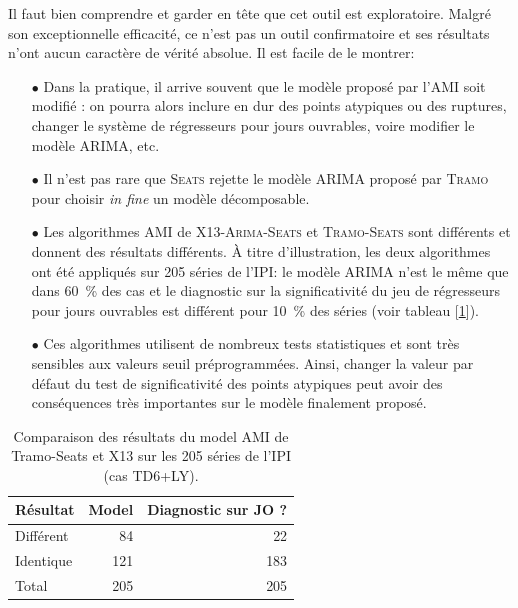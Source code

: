 \documentclass[12pt, a4paper, french]{article}
\begin{document}
Il faut bien comprendre et garder en tête que cet outil est exploratoire. Malgré son exceptionnelle efficacité, ce n'est pas un outil confirmatoire et ses résultats n'ont aucun caractère de vérité absolue. Il est facile de le montrer:
\begin{itemize}
	\item[$\bullet$] Dans la pratique, il arrive souvent que le modèle proposé par l'AMI soit modifié : on pourra alors inclure en dur des points atypiques ou des ruptures, changer le système de régresseurs pour jours ouvrables, voire modifier le modèle ARIMA, etc.
	\item[$\bullet$] Il n'est pas rare que \textsc{Seats} rejette le modèle ARIMA proposé par \textsc{Tramo} pour choisir \emph{in fine} un modèle décomposable.
	\item[$\bullet$] Les algorithmes AMI de \textsc{X13-Arima-Seats} et \textsc{Tramo-Seats} sont différents et donnent des résultats différents. À titre d'illustration, les deux algorithmes ont été appliqués sur 205 séries de l'IPI: le modèle ARIMA n'est le même que dans 60~\% des cas et le diagnostic sur la significativité du jeu de régresseurs pour jours ouvrables est différent pour 10~\% des séries (voir tableau [\ref{table:CompareTSX13}]).
	\item[$\bullet$] Ces algorithmes utilisent de nombreux tests statistiques et sont très sensibles aux valeurs seuil préprogrammées. Ainsi, changer la valeur par défaut du test de significativité des points atypiques peut avoir des conséquences très importantes sur le modèle finalement proposé.
\end{itemize}

\begin{table}
\caption[Comparaison des résultats du model AMI de Tramo-Seats et X13 sur les 205 séries de l'IPI (cas TD6+LY)]{Comparaison des résultats du model AMI de Tramo-Seats et X13 sur les 205 séries de l'IPI (cas TD6+LY).}\label{table:CompareTSX13}
\begin{center}
\small
\begin{tabular}{lrr} \\
\hline
\rule{0pt}{3ex}Résultat&Model&Diagnostic sur JO ?  \\
\hline
Différent&  84&  22 \\
Identique& 121& 183 \\
\hline
Total& 205 & 205  \\
\hline
\end{tabular}
\normalsize
\end{center}
\end{table}
\end{document}
